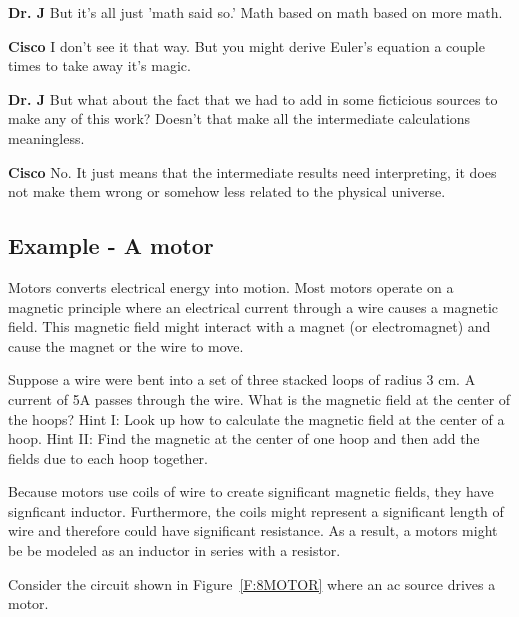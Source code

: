 \setlength{\hangindent}{30pt}\noindent \textbf{Dr. J}
But it's all just 'math said so.' Math based on math based on more math.

\setlength{\hangindent}{30pt}\noindent \textbf{Cisco}
I don't see it that way. But you might derive Euler's equation a couple times to take away it's magic. 

\setlength{\hangindent}{30pt}\noindent \textbf{Dr. J}
But what about the fact that we had to add in some ficticious sources to make any of this work? Doesn't that make all the intermediate calculations meaningless.

\setlength{\hangindent}{30pt}\noindent \textbf{Cisco}
No. It just means that the intermediate results need interpreting, it does not make them wrong or somehow less related to the physical universe.

\subsection{Example - A motor}
Motors converts electrical energy into motion. Most motors operate on a magnetic principle where an electrical current through a wire causes a magnetic field. This magnetic field might interact with a magnet (or electromagnet) and cause the magnet or the wire to move. 

\begin{clevel}
Suppose a wire were bent into a set of three stacked loops of radius 3 cm. A current of 5A passes through the wire. What is the magnetic field at the center of the hoops? Hint I: Look up how to calculate the magnetic field at the center of a hoop. Hint II: Find the magnetic at the center of one hoop and then add the fields due to each hoop together.
\end{clevel}

Because motors use coils of wire to create significant magnetic fields, they have signficant inductor. Furthermore, the coils might represent a significant length of wire and therefore could have significant resistance. As a result, a motors might be be modeled as an inductor in series with a resistor.\par

Consider the circuit shown in Figure~\ref{F:8MOTOR} where an ac source drives a motor.

